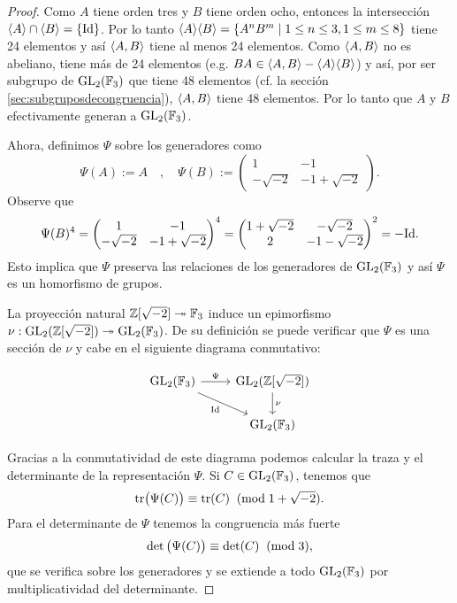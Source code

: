 \documentclass[../../tesis_maestria]{subfiles}
\begin{document}
\begin{proof}
  Como $A$ tiene orden tres y $B$ tiene orden ocho, entonces la intersecci\'on $\langle A \rangle\cap\langle B \rangle=\{\mathrm{Id}\}$. Por lo tanto $\langle A \rangle\langle B \rangle=\{A^nB^m\mid 1\leq n\leq 3,1\leq m\leq 8\}$ tiene 24 elementos y as\'i $\langle A,B \rangle$ tiene al menos 24 elementos. Como $\langle A,B \rangle$ no es abeliano, tiene m\'as de 24 elementos (e.g. $BA\in\langle A,B \rangle-\langle A \rangle\langle B \rangle$) y as\'i, por ser subgrupo de $\mathrm{GL}_2(\mathbb{F}_3)$ que tiene 48 elementos (cf. la sección \ref{sec:subgruposdecongruencia}), $\langle A,B \rangle$ tiene 48 elementos. Por lo tanto que $A$ y $B$ efectivamente generan a $\mathrm{GL}_2(\mathbb{F}_3)$.
  
Ahora, definimos $\Psi$ sobre los generadores como
  \[
    \Psi(A):= A \quad,\quad
    \Psi(B):=
    \begin{pmatrix}1 & -1 \\ -\sqrt{-2} & -1+\sqrt{-2}\end{pmatrix}.
  \]
Observe que 
\[
	\Psi(B)^4=\begin{pmatrix}1 & -1\\ -\sqrt{-2} & -1+\sqrt{-2}\end{pmatrix}^4=\begin{pmatrix}1+\sqrt{-2} & -\sqrt{-2}\\ 2 & -1-\sqrt{-2}\end{pmatrix}^2=-\mathrm{Id}.
\]
Esto implica que $\Psi$ preserva las relaciones de los generadores de $\mathrm{GL}_2(\mathbb{F}_3)$ y as\'i $\Psi$ es un homorfismo de grupos.

  La proyecci\'on natural $\mathbb{Z}[\sqrt{-2}]\twoheadrightarrow\mathbb{F}_3$ induce un epimorfismo $\nu:\mathrm{GL}_2(\mathbb{Z}[\sqrt{-2}])\twoheadrightarrow\mathrm{GL}_2(\mathbb{F}_3)$. De su definici\'on se puede verificar que $\Psi$ es una secci\'on de $\nu$ y cabe en el siguiente diagrama conmutativo:
  
\begin{equation}\label{cd:seccion_de_nu}
  \begin{tikzcd}
    \GL_2(\FF_3) \arrow[r,"\Psi"] \arrow[dr,"\Id"'] & \GL_2(\ZZ[\sqrt{-2}]) \arrow[d,"\nu"] \\
    & \GL_2(\FF_3)
  \end{tikzcd}
\end{equation}
  
  Gracias a la conmutatividad de este diagrama podemos calcular la traza y el determinante de la representaci\'on $\Psi$. Si $C\in\mathrm{GL}_2(\mathbb{F}_3)$, tenemos que
  \begin{equation}
    \label{eq:traza_mod_3}
    \mathrm{tr}\big(\Psi(C)\big)\equiv\mathrm{tr}(C) \;\;(\mathrm{mod}\; 1+\sqrt{-2}).
  \end{equation}
  Para el determinante de $\Psi$ tenemos la congruencia m\'as fuerte
    \begin{equation}
    \label{eq:det_mod_3}
    \det\big(\Psi(C)\big)\equiv\det(C) \;\;(\mathrm{mod}\; 3),
  \end{equation}
  que se verifica sobre los generadores y se extiende a todo $\mathrm{GL}_2(\mathbb{F}_3)$ por multiplicatividad del determinante.
  

\end{proof}
\end{document}
